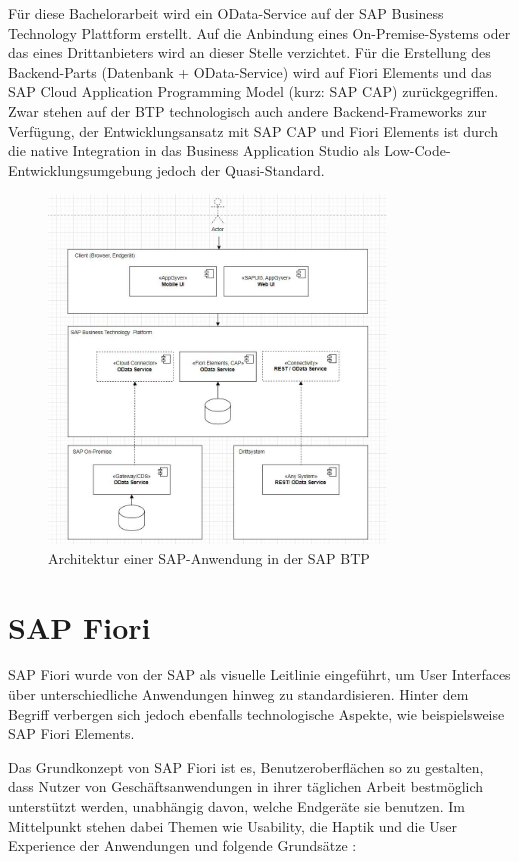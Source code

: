 Für diese Bachelorarbeit wird ein OData-Service auf der SAP Business Technology Plattform erstellt. Auf die Anbindung eines On-Premise-Systems oder das eines Drittanbieters wird an dieser Stelle verzichtet. Für die Erstellung des Backend-Parts (Datenbank + OData-Service) wird auf Fiori Elements und das SAP Cloud Application Programming Model (kurz: SAP CAP) zurückgegriffen. Zwar stehen auf der BTP technologisch auch andere Backend-Frameworks zur Verfügung, der Entwicklungsansatz mit SAP CAP und Fiori Elements ist durch die native Integration in das Business Application Studio als Low-Code-Entwicklungsumgebung jedoch der Quasi-Standard. 

\begin{figure}[htbp]
 \centering
 \includegraphics[width=0.8\textwidth]{Bilder/SAP BTP OData architecture/SAP_Anwendung_Architektur.jpg}
 \caption{Architektur einer SAP-Anwendung in der SAP BTP}
\end{figure}


\section{SAP Fiori}

SAP Fiori wurde von der SAP als visuelle Leitlinie eingeführt, um User Interfaces über unterschiedliche Anwendungen hinweg zu standardisieren. Hinter dem Begriff verbergen sich jedoch ebenfalls technologische Aspekte, wie beispielsweise SAP Fiori Elements.

Das Grundkonzept von SAP Fiori ist es, Benutzeroberflächen so zu gestalten, dass Nutzer von Geschäftsanwendungen in ihrer täglichen Arbeit bestmöglich unterstützt werden, unabhängig davon, welche Endgeräte sie benutzen. Im Mittelpunkt stehen dabei Themen wie Usability, die Haptik und die User Experience der Anwendungen und folgende Grundsätze \cite[S.31]{fiori}:

